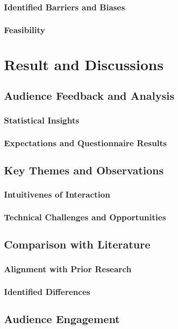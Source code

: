 \documentclass[a4paper, 12pt]{report}
\begin{document}
        \subsection{Identified Barriers and Biases}
        \subsection{Feasibility}
    

\chapter{Result and Discussions}
    \section{Audience Feedback and Analysis}
        \subsection{Statistical Insights}
        \subsection{Expectations and Questionnaire Results}
    \section{Key Themes and Observations}
        \subsection{Intuitivenes of Interaction}
        \subsection{Technical Challenges and Opportunities}
    \section{Comparison with Literature}
        \subsection{Alignment with Prior Research}
        \subsection{Identified Differences}
    \section{Audience Engagement}
\end{document}
